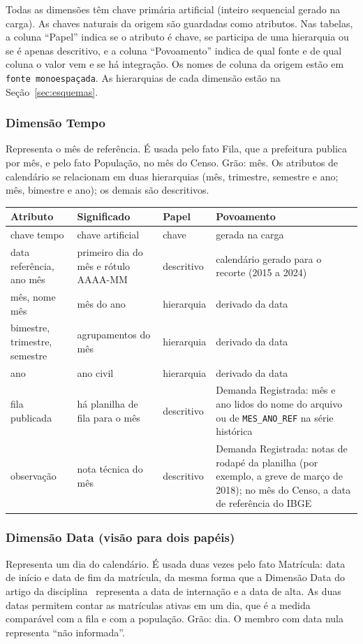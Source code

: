 \documentclass[11pt,a4paper]{article}
\newcommand{\cod}[1]{\texttt{#1}}
\newenvironment{atributos}{%
  \small
  \begin{longtable}{>{\raggedright}p{2.6cm}>{\raggedright}p{4.6cm}>{\raggedright}p{1.9cm}>{\raggedright\arraybackslash}p{5.3cm}}
  \toprule \textbf{Atributo} & \textbf{Significado} & \textbf{Papel} & \textbf{Povoamento}\\ \midrule \endhead
  \bottomrule \endlastfoot
}{\end{longtable}\addtocounter{table}{-1}}
\begin{document}
Todas as dimensões têm chave primária artificial (inteiro sequencial gerado na carga). As chaves naturais da origem são guardadas como atributos. Nas tabelas, a coluna ``Papel'' indica se o atributo é chave, se participa de uma hierarquia ou se é apenas descritivo, e a coluna ``Povoamento'' indica de qual fonte e de qual coluna o valor vem e se há integração. Os nomes de coluna da origem estão em \cod{fonte monoespaçada}. As hierarquias de cada dimensão estão na Seção~\ref{sec:esquemas}.

\subsubsection{Dimensão Tempo}
Representa o mês de referência. É usada pelo fato Fila, que a prefeitura publica por mês, e pelo fato População, no mês do Censo. Grão: mês. Os atributos de calendário se relacionam em duas hierarquias (mês, trimestre, semestre e ano; mês, bimestre e ano); os demais são descritivos.

\begin{atributos}
chave tempo & chave artificial & chave & gerada na carga \\
data referência, ano mês & primeiro dia do mês e rótulo AAAA-MM & descritivo & calendário gerado para o recorte (2015 a 2024) \\
mês, nome mês & mês do ano & hierarquia & derivado da data \\
bimestre, trimestre, semestre & agrupamentos do mês & hierarquia & derivado da data \\
ano & ano civil & hierarquia & derivado da data \\
fila publicada & há planilha de fila para o mês & descritivo & Demanda Registrada: mês e ano lidos do nome do arquivo ou de \cod{MES_ANO_REF} na série histórica \\
observação & nota técnica do mês & descritivo & Demanda Registrada: notas de rodapé da planilha (por exemplo, a greve de março de 2018); no mês do Censo, a data de referência do IBGE \\
\end{atributos}

\subsubsection{Dimensão Data (visão para dois papéis)}
Representa um dia do calendário. É usada duas vezes pelo fato Matrícula: data de início e data de fim da matrícula, da mesma forma que a Dimensão Data do artigo da disciplina~\cite{ciferri-saude} representa a data de internação e a data de alta. As duas datas permitem contar as matrículas ativas em um dia, que é a medida comparável com a fila e com a população. Grão: dia. O membro com data nula representa ``não informada''.
\end{document}
